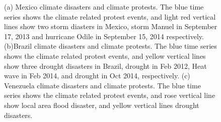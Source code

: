 \documentclass[9pt,twocolumn,twoside]{pnas-new}
\begin{document}
\begin{figure}[ht]
	\centering
	\caption{(a) Mexico climate disasters and climate protests. The blue time series shows the climate related protest events, and light red vertical lines show two storm diasters in Mexico, storm Manuel in September 17, 2013 and hurricane Odile in September 15, 2014 respectively. (b)Brazil climate disasters and climate protests. The blue time series shows the climate related protest events, and yellow vertical lines show three drought disasters in Brazil, drought in Feb 2012, Heat wave in Feb 2014, and drought in Oct 2014, respectively. (c) Venezuela climate disasters and climate protests. The blue time series shows the climate related protest events, and rose vertical line show local area flood disaster, and yellow vertical lines drought disasters.}
\label{climate-timeseries}
\end{figure}
\end{document}
